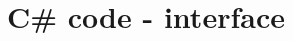 \newpage
\section{C\# code - interface}
\lstset{language=[Sharp]C}
\begin{lstlisting}

\end{lstlisting}